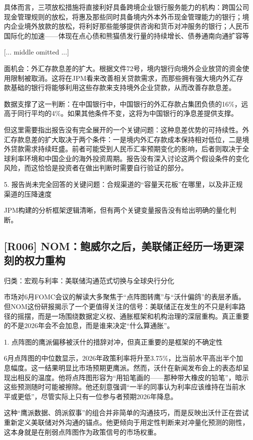 \documentclass[11pt]{ctexart}
\begin{document}
具体而言，三项放松措施将直接利好具备跨境企业银行服务能力的机构：跨国公司现金管理规则的放松，将惠及那些同时具备境内外本外币现金管理能力的银行；境内企业境外放款的放松，将利好那些能够提供咨询和货币对冲服务的银行；人民币国际化的加速——体现在点心债和熊猫债发行量的持续增长、债券通南向通扩容等

[... middle omitted ...]

面机会：外汇存款息差的扩大。根据文件72号，境内银行向境外企业放贷的资金使用限制被取消。这将在JPM看来改善相关贷款需求，而那些拥有强大境内外汇存款基础的银行将能够利用这些存款来支持境外企业贷款，从而改善存款息差。

数据支撑了这一判断：在中国银行中，中国银行的外汇存款占集团负债的16\%，远高于同行平均的4\%。如果其他条件不变，这将为中国银行的净息差提供支撑。

但这里需要指出报告没有完全展开的一个关键问题：这种息差优势的可持续性。外汇存款息差的扩大取决于两个条件：一是境内外汇存款成本保持相对低位，二是境外贷款需求持续旺盛。前者可能受到人民币汇率预期变化的影响，后者则取决于全球利率环境和中国企业的海外投资周期。报告没有深入讨论这两个假设条件的变化风险，而这恰恰是投资者在做出判断时需要自行验证的部分。

5. 报告尚未完全回答的关键问题：合规渠道的“容量天花板”在哪里，以及非正规渠道的压降速度

JPM构建的分析框架逻辑清晰，但有两个关键变量报告没有给出明确的量化判断。

\subsection{[R006] NOM：鲍威尔之后，美联储正经历一场更深刻的权力重构}
{\small\color{refgray}归类：宏观与利率：美联储沟通范式切换与全球央行分化}

市场对6月FOMC会议的解读大多聚焦于“点阵图转鹰”与“沃什偏鸽”的表层矛盾。但NOM这份研报揭示了一个更值得关注的信号：美联储正在发生的不只是利率路径的摇摆，而是一场围绕数据定义权、通胀框架和机构治理的深层重构。真正重要的不是2026年会不会加息，而是谁来决定“什么算通胀”。

1. 点阵图的鹰派偏移被沃什的措辞对冲，但真正重要的是框架的不确定性

6月点阵图的中位数显示，2026年政策利率将升至3.75\%，比当前水平高出半个加息幅度。这一结果明显比市场预期更鹰派。然而，沃什在新闻发布会上的表态却呈现出相反的温度。他将点阵图形容为“用铅笔画的——那种带大橡皮的铅笔”，暗示这些预测随时可能被擦除。他还刻意强调“一半的同事认为利率应该维持在当前水平或更低”，尽管实际上只有一位参与者预期2026年降息。

这种“鹰派数据、鸽派叙事”的组合并非简单的沟通技巧，而是反映出沃什正在尝试重新定义美联储对外沟通的锚点。他更倾向于用定性判断来对冲量化预测的刚性，这本身就是在削弱点阵图作为政策信号的市场权重。
\end{document}

